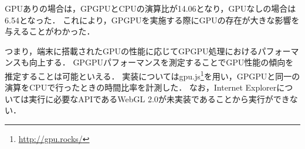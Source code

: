 GPUありの場合は，GPGPUとCPUの演算比が14.06となり，GPUなしの場合は6.54となった．
これにより，GPGPUを実施する際にGPUの存在が大きな影響を与えることがわかった．

つまり，端末に搭載されたGPUの性能に応じてGPGPU処理におけるパフォーマンスも向上する．
GPGPUパフォーマンスを測定することでGPU性能の傾向を推定することは可能といえる．
実装についてはgpu.js\footnote{\url{http://gpu.rocks/}}を用い，GPGPUと同一の演算をCPUで行ったときの時間比率を計測した．
なお，Internet Explorerについては実行に必要なAPIであるWebGL 2.0が未実装であることから実行ができない．
